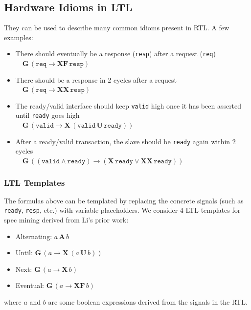 \documentclass[acmlarge,11pt]{acmart}
\begin{document}
\subsection{Hardware Idioms in LTL}
They can be used to describe many common idioms present in RTL. A few examples:
\begin{itemize}
  \item There should eventually be a response (\texttt{resp}) after a request (\texttt{req}) \\
    $\quad \mathbf{G}\, (\mathtt{req} \rightarrow \mathbf{XF}\, \mathtt{resp})$
  \item There should be a response in 2 cycles after a request \\
    $\quad \mathbf{G}\, (\mathtt{req} \rightarrow \mathbf{XX}\, \mathtt{resp})$
  \item The ready/valid interface should keep \texttt{valid} high once it has been asserted until \texttt{ready} goes high \\
    $\quad \mathbf{G}\, (\mathtt{valid} \rightarrow \mathbf{X}\, (\mathtt{valid}\, \mathbf{U}\, \mathtt{ready}))$
  \item After a ready/valid transaction, the slave should be \texttt{ready} again within 2 cycles \\
    $\quad \mathbf{G}\, ((\mathtt{valid} \land \mathtt{ready}) \rightarrow (\mathbf{X}\, \mathtt{ready} \lor \mathbf{XX}\, \mathtt{ready}))$
\end{itemize}

\subsubsection{LTL Templates} \label{templates}
The formulas above can be templated by replacing the concrete signals (such as \texttt{ready}, \texttt{resp}, etc.) with variable placeholders. We consider 4 LTL templates for spec mining derived from Li's prior work\cite{Li_2014}:

\begin{itemize}
  \item Alternating: $a\, \mathbf{A}\, b$
  \item Until: $\mathbf{G}\, (a \rightarrow \mathbf{X}\, (a\, \mathbf{U}\, b))$
  \item Next: $\mathbf{G}\, (a \rightarrow \mathbf{X}\, b)$
  \item Eventual: $\mathbf{G}\, (a \rightarrow \mathbf{X F}\, b)$
\end{itemize}

where $a$ and $b$ are some boolean expressions derived from the signals in the RTL.
\end{document}

